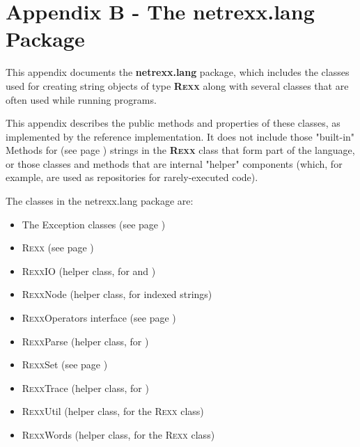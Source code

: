 \chapter{Appendix B - The netrexx.lang Package}\label{refappc}
 
This appendix documents the \textbf{netrexx.lang}
package, which includes the classes used for creating string objects of
type \textbf{R\textsc{exx}} along with several classes that are often used
while running \nr{} programs.
 
This appendix describes the public methods and properties of these
classes, as implemented by the reference implementation.  It does not
include those "built-in"  Methods for \nr{} (see page \pageref{refbmeth}) 
strings in the \textbf{R\textsc{exx}} class that form part of the
\nr{} language, or those classes and methods that are internal
"helper" components (which, for example, are used as
repositories for rarely-executed code).
 
The classes in the netrexx.lang package are:
\begin{itemize}
\item The  Exception classes (see page \pageref{refnlexcep}) 
\item  R\textsc{exx} (see page \pageref{refnlrexx}) 
\item R\textsc{exx}IO (helper class, for  and )
\item R\textsc{exx}Node (helper class, for indexed strings)
\item  R\textsc{exx}Operators interface (see page \pageref{refnlrops}) 
\item R\textsc{exx}Parse (helper class, for )
\item  R\textsc{exx}Set (see page \pageref{refnlrset}) 
\item R\textsc{exx}Trace (helper class, for )
\item R\textsc{exx}Util (helper class, for the R\textsc{exx} class)
\item R\textsc{exx}Words (helper class, for the R\textsc{exx} class)
\end{itemize}
